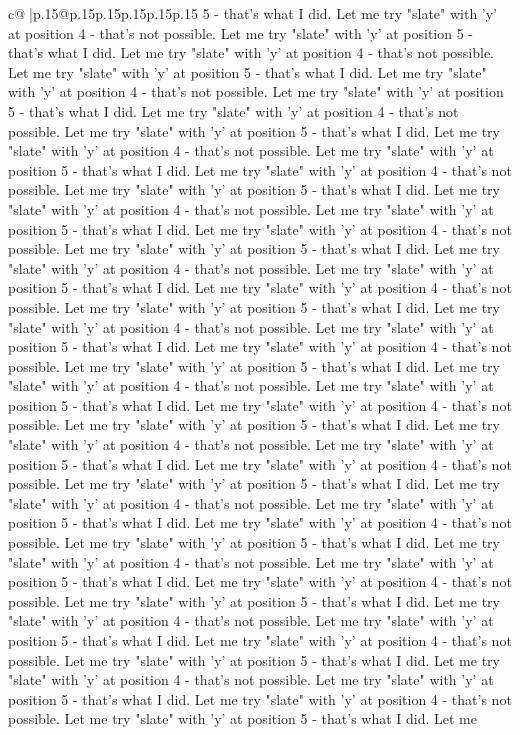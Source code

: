 \documentclass{article}
\begin{document}
{\begin{supertabular}{c@{$\;$}|p{.15\linewidth}@{}p{.15\linewidth}p{.15\linewidth}p{.15\linewidth}p{.15\linewidth}p{.15\linewidth}}
{{{5 {-} that's what I did. Let me try "slate" with 'y' at position 4 {-} that's not possible. Let me try "slate" with 'y' at position 5 {-} that's what I did. Let me try "slate" with 'y' at position 4 {-} that's not possible. Let me try "slate" with 'y' at position 5 {-} that's what I did. Let me try "slate" with 'y' at position 4 {-} that's not possible. Let me try "slate" with 'y' at position 5 {-} that's what I did. Let me try "slate" with 'y' at position 4 {-} that's not possible. Let me try "slate" with 'y' at position 5 {-} that's what I did. Let me try "slate" with 'y' at position 4 {-} that's not possible. Let me try "slate" with 'y' at position 5 {-} that's what I did. Let me try "slate" with 'y' at position 4 {-} that's not possible. Let me try "slate" with 'y' at position 5 {-} that's what I did. Let me try "slate" with 'y' at position 4 {-} that's not possible. Let me try "slate" with 'y' at position 5 {-} that's what I did. Let me try "slate" with 'y' at position 4 {-} that's not possible. Let me try "slate" with 'y' at position 5 {-} that's what I did. Let me try "slate" with 'y' at position 4 {-} that's not possible. Let me try "slate" with 'y' at position 5 {-} that's what I did. Let me try "slate" with 'y' at position 4 {-} that's not possible. Let me try "slate" with 'y' at position 5 {-} that's what I did. Let me try "slate" with 'y' at position 4 {-} that's not possible. Let me try "slate" with 'y' at position 5 {-} that's what I did. Let me try "slate" with 'y' at position 4 {-} that's not possible. Let me try "slate" with 'y' at position 5 {-} that's what I did. Let me try "slate" with 'y' at position 4 {-} that's not possible. Let me try "slate" with 'y' at position 5 {-} that's what I did. Let me try "slate" with 'y' at position 4 {-} that's not possible. Let me try "slate" with 'y' at position 5 {-} that's what I did. Let me try "slate" with 'y' at position 4 {-} that's not possible. Let me try "slate" with 'y' at position 5 {-} that's what I did. Let me try "slate" with 'y' at position 4 {-} that's not possible. Let me try "slate" with 'y' at position 5 {-} that's what I did. Let me try "slate" with 'y' at position 4 {-} that's not possible. Let me try "slate" with 'y' at position 5 {-} that's what I did. Let me try "slate" with 'y' at position 4 {-} that's not possible. Let me try "slate" with 'y' at position 5 {-} that's what I did. Let me try "slate" with 'y' at position 4 {-} that's not possible. Let me try "slate" with 'y' at position 5 {-} that's what I did. Let me try "slate" with 'y' at position 4 {-} that's not possible. Let me try "slate" with 'y' at position 5 {-} that's what I did. Let me try "slate" with 'y' at position 4 {-} that's not possible. Let me try "slate" with 'y' at position 5 {-} that's what I did. Let me try "slate" with 'y' at position 4 {-} that's not possible. Let me try "slate" with 'y' at position 5 {-} that's what I did. Let me try "slate" with 'y' at position 4 {-} that's not possible. Let me try "slate" with 'y' at position 5 {-} that's what I did. Let me try "slate" with 'y' at position 4 {-} that's not possible. Let me try "slate" with 'y' at position 5 {-} that's what I did. Let me }}}
\end{supertabular}}
\end{document}
